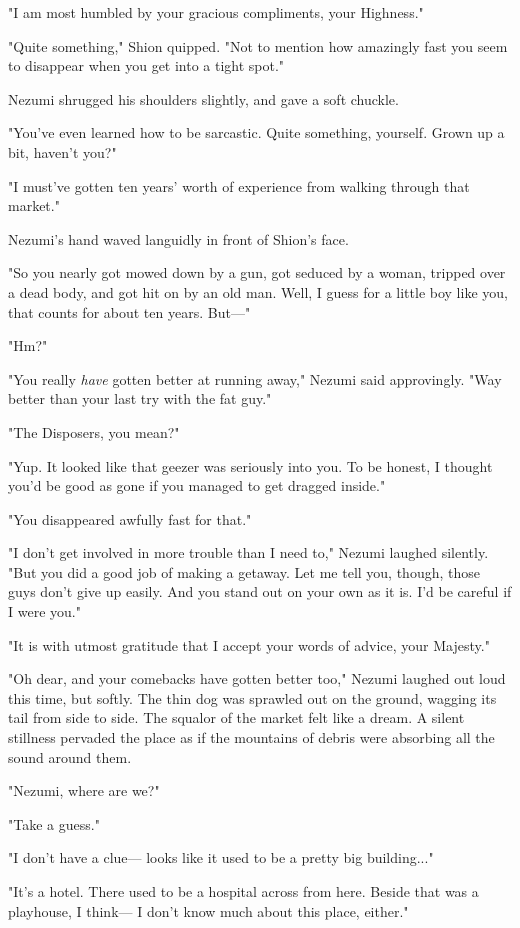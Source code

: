 "I am most humbled by your gracious compliments, your Highness."

"Quite something," Shion quipped. "Not to mention how amazingly fast you
seem to disappear when you get into a tight spot."

Nezumi shrugged his shoulders slightly, and gave a soft chuckle.

"You've even learned how to be sarcastic. Quite something, yourself.
Grown up a bit, haven't you?"

"I must've gotten ten years' worth of experience from walking through
that market."

Nezumi's hand waved languidly in front of Shion's face.

"So you nearly got mowed down by a gun, got seduced by a woman, tripped
over a dead body, and got hit on by an old man. Well, I guess for a
little boy like you, that counts for about ten years. But---"

"Hm?"

"You really \emph{have} gotten better at running away," Nezumi said
approvingly. "Way better than your last try with the fat guy."

"The Disposers, you mean?"

"Yup. It looked like that geezer was seriously into you. To be honest, I
thought you'd be good as gone if you managed to get dragged inside."

"You disappeared awfully fast for that."

"I don't get involved in more trouble than I need to," Nezumi laughed
silently. "But you did a good job of making a getaway. Let me tell you,
though, those guys don't give up easily. And you stand out on your own
as it is. I'd be careful if I were you."

"It is with utmost gratitude that I accept your words of advice, your
Majesty."

"Oh dear, and your comebacks have gotten better too," Nezumi laughed out
loud this time, but softly. The thin dog was sprawled out on the ground,
wagging its tail from side to side. The squalor of the market felt like
a dream. A silent stillness pervaded the place as if the mountains of
debris were absorbing all the sound around them.

"Nezumi, where are we?"

"Take a guess."

"I don't have a clue--- looks like it used to be a pretty big building..."

"It's a hotel. There used to be a hospital across from here. Beside that
was a playhouse, I think--- I don't know much about this place, either."

